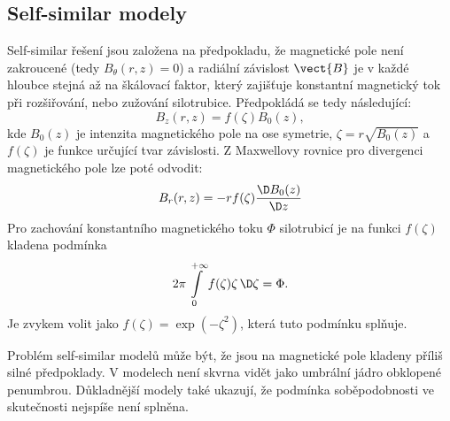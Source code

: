 \subsection{Self-similar modely}
Self-similar řešení jsou založena na předpokladu, že magnetické pole není zakroucené (tedy $B_\theta(r,z)=0$) a radiální závislost $\vect{B}$ je v každé hloubce stejná až na škálovací faktor, který zajišťuje konstantní magnetický tok při rozšiřování, nebo zužování silotrubice. Předpokládá se tedy následující:
\begin{equation}
	B_z(r,z)=f(\zeta)B_0(z),
	\label{eq:Bz}
\end{equation}
kde $B_0(z)$ je intenzita magnetického pole na ose symetrie, $\zeta=r\sqrt{B_0(z)}$ a $f(\zeta)$ je funkce určující tvar závislosti. Z Maxwellovy rovnice pro divergenci magnetického pole lze poté odvodit:
\begin{equation}
	B_r(r,z)=-rf(\zeta)\frac{\D B_0(z)}{\D z}
	\label{eq:Br}
\end{equation}
Pro zachování konstantního magnetického toku $\Phi$ silotrubicí je na funkci $f(\zeta)$ kladena podmínka
\begin{equation}
	2\pi\int\limits_0^{+\infty}f(\zeta)\zeta\,\D\zeta=\Phi.
\end{equation}
Je zvykem volit jako $f(\zeta)=\exp(-\zeta^2)$, která tuto podmínku splňuje.

Problém self-similar modelů může být, že jsou na magnetické pole kladeny příliš silné předpoklady. V modelech není skvrna vidět jako umbrální jádro obklopené penumbrou. Důkladnější modely také ukazují, že podmínka soběpodobnosti ve skutečnosti nejspíše není splněna.